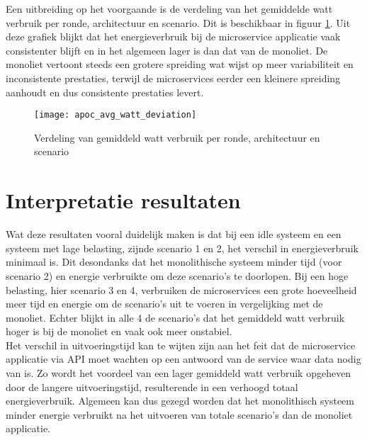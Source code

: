 Een uitbreiding op het voorgaande is de verdeling van het gemiddelde watt verbruik per ronde, architectuur en scenario. Dit is beschikbaar in figuur \ref{apoc_avg_watt_deviation}. Uit deze grafiek blijkt dat het energieverbruik bij de microservice applicatie vaak consistenter blijft en in het algemeen lager is dan dat van de monoliet. De monoliet vertoont steeds een grotere spreiding wat wijst op meer variabiliteit en inconsistente prestaties, terwijl de microservices eerder een kleinere spreiding aanhoudt en dus consistente prestaties levert.
\begin{figure}[h!]
    \texttt{[image: apoc\_avg\_watt\_deviation]}
    \centering
    \caption{Verdeling van gemiddeld watt verbruik per ronde, architectuur en scenario}
    \label{apoc_avg_watt_deviation}
\end{figure}

\section{Interpretatie resultaten}
Wat deze resultaten vooral duidelijk maken is dat bij een idle systeem en een systeem met lage belasting, zijnde scenario 1 en 2, het verschil in energieverbruik minimaal is. Dit desondanks dat het monolithische systeem minder tijd (voor scenario 2) en energie verbruikte om deze scenario's te doorlopen. Bij een hoge belasting, hier scenario 3 en 4, verbruiken de microservices een grote hoeveelheid meer tijd en energie om de scenario's uit te voeren in vergelijking met de monoliet. Echter blijkt in alle 4 de scenario's dat het gemiddeld watt verbruik hoger is bij de monoliet en vaak ook meer onstabiel. \\

Het verschil in uitvoeringstijd kan te wijten zijn aan het feit dat de microservice applicatie via API moet wachten op een antwoord van de service waar data nodig van is. Zo wordt het voordeel van een lager gemiddeld watt verbruik opgeheven door de langere uitvoeringstijd, resulterende in een verhoogd totaal energieverbruik. Algemeen kan dus gezegd worden dat het monolithisch systeem minder energie verbruikt na het uitvoeren van totale scenario's dan de monoliet applicatie.

